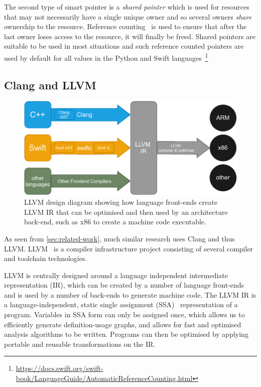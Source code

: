 \documentclass{mpaper}
\begin{document}
    The second type of smart pointer is a \emph{shared pointer} which is used for resources that may not necessarily have a single unique owner and so several owners \emph{share} ownership to the resource.
    Reference counting~\cite{Collins1960} is used to ensure that after the last owner loses access to the resource, it will finally be freed.
    Shared pointers are suitable to be used in most situations and such reference counted pointers are used by default for all values in the Python and Swift languages~\footnote{\url{https://docs.swift.org/swift-book/LanguageGuide/AutomaticReferenceCounting.html}}
    
    \subsection{Clang and LLVM}\label{subsec:clang-and-llvm}
    
    \begin{figure}
        \centering
        \includegraphics[scale=0.75]{images/llvm.pdf}
        \caption{LLVM design diagram showing how language front-ends create LLVM IR that can be optimised and then used by an architecture back-end, such as x86 to create a machine code executable.}
        \label{fig:llvm-design}
    \end{figure}  
    
    As seen from \autoref{sec:related-work}, much similar research uses Clang and thus LLVM.
    LLVM~\cite{Lattner2004} is a compiler infrastructure project consisting of several compiler and toolchain technologies. 
    
    LLVM is centrally designed around a language independent intermediate representation (IR), which can be created by a number of language front-ends and is used by a number of back-ends to generate machine code. 
    The LLVM IR is a language-independent, static single assignment (SSA)~\cite{Rosen1988} representation of a program.
    Variables in SSA form can only be assigned once, which allows us to efficiently generate definition-usage graphs, and allows for fast and optimised analysis algorithms to be written.
    Programs can then be optimised by applying portable and reusable transformations on the IR.
    
\end{document}
